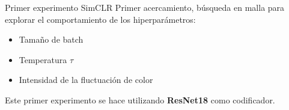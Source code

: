 \documentclass[aspectratio=169]{beamer}
\begin{document}
  
  \begin{frame}{Primer experimento SimCLR}
  Primer acercamiento, búsqueda en malla para explorar el comportamiento de los hiperparámetros:
  \pause

  \begin{itemize}
   \item Tamaño de batch 
   \item Temperatura $\tau$
   \item Intensidad de la fluctuación de color
  \end{itemize}
  \pause

  Este primer experimento se hace utilizando \textbf{ResNet18} como codificador.
  \pause



  \begin{table}[H]
\centering
{}
\end{table}
  

  \end{frame}
\end{document}
